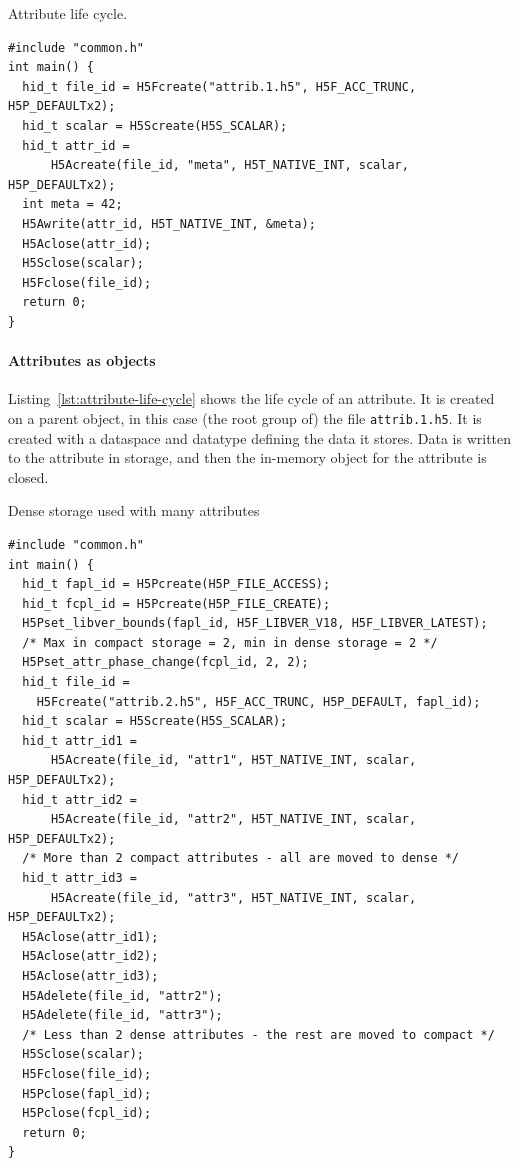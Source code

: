 \begin{listing}
\centering
\caption{Attribute life cycle.}
\label{lst:attribute-life-cycle}
\begin{verbatim}
#include "common.h"
int main() {
  hid_t file_id = H5Fcreate("attrib.1.h5", H5F_ACC_TRUNC, H5P_DEFAULTx2);
  hid_t scalar = H5Screate(H5S_SCALAR);
  hid_t attr_id =
      H5Acreate(file_id, "meta", H5T_NATIVE_INT, scalar, H5P_DEFAULTx2);
  int meta = 42;
  H5Awrite(attr_id, H5T_NATIVE_INT, &meta);
  H5Aclose(attr_id);
  H5Sclose(scalar);
  H5Fclose(file_id);
  return 0;
}
\end{verbatim}
\end{listing}

\paragraph{Attributes as objects} Listing~\ref{lst:attribute-life-cycle} shows the life cycle of an attribute. It is created on a parent object, in this case (the root group of) the file \texttt{attrib.1.h5}. It is created with a dataspace and datatype defining the data it stores. Data is written to the attribute in storage, and then the in-memory object for the attribute is closed.

\begin{listing}
\centering
\caption{Dense storage used with many attributes}
\label{lst:attribute-dense-storage-many}
\begin{verbatim}
#include "common.h"
int main() {
  hid_t fapl_id = H5Pcreate(H5P_FILE_ACCESS);
  hid_t fcpl_id = H5Pcreate(H5P_FILE_CREATE);
  H5Pset_libver_bounds(fapl_id, H5F_LIBVER_V18, H5F_LIBVER_LATEST);
  /* Max in compact storage = 2, min in dense storage = 2 */
  H5Pset_attr_phase_change(fcpl_id, 2, 2);
  hid_t file_id =
    H5Fcreate("attrib.2.h5", H5F_ACC_TRUNC, H5P_DEFAULT, fapl_id);
  hid_t scalar = H5Screate(H5S_SCALAR);
  hid_t attr_id1 =
      H5Acreate(file_id, "attr1", H5T_NATIVE_INT, scalar, H5P_DEFAULTx2);
  hid_t attr_id2 =
      H5Acreate(file_id, "attr2", H5T_NATIVE_INT, scalar, H5P_DEFAULTx2);
  /* More than 2 compact attributes - all are moved to dense */
  hid_t attr_id3 =
      H5Acreate(file_id, "attr3", H5T_NATIVE_INT, scalar, H5P_DEFAULTx2);
  H5Aclose(attr_id1);
  H5Aclose(attr_id2);
  H5Aclose(attr_id3);
  H5Adelete(file_id, "attr2");
  H5Adelete(file_id, "attr3");
  /* Less than 2 dense attributes - the rest are moved to compact */
  H5Sclose(scalar);
  H5Fclose(file_id);
  H5Pclose(fapl_id);
  H5Pclose(fcpl_id);
  return 0;
}
\end{verbatim}
\end{listing}

